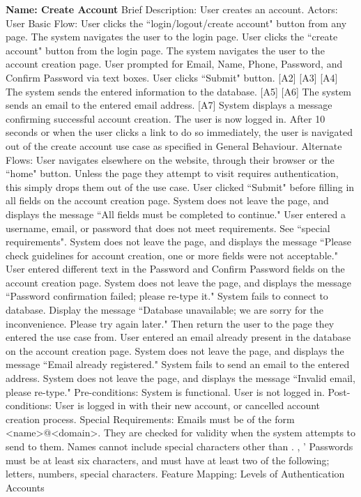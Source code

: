 \begin{outline}[enumerate]
\1 {\bf Name: Create Account}
\2 Brief Description: User creates an account.
\2 Actors: User
\2 Basic Flow:
\3 User clicks the ``login/logout/create account" button from any page.
\3 The system navigates the user to the login page.
\3 User clicks the ``create account" button from the login page.
\3 The system navigates the user to the account creation page.
\3 User prompted for Email, Name, Phone, Password, and Confirm Password via text boxes.
\3 User clicks ``Submit" button. [A2] [A3] [A4]
\3 The system sends the entered information to the database. [A5] [A6]
\3 The system sends an email to the entered email address. [A7]
\3 System displays a message confirming successful account creation.  The user is now logged in.
\3 After 10 seconds or when the user clicks a link to do so immediately, the user is navigated out of the create account use case as specified in General Behaviour.
\2 Alternate Flows:
\3 [A1] User navigates elsewhere on the website, through their browser or the ``home" button.  Unless the page they attempt to visit requires authentication, this simply drops them out of the use case.
\3 [A2] User clicked ``Submit" before filling in all fields on the account creation page.  System does not leave the page, and displays the message ``All fields must be completed to continue."
\3 [A3] User entered a username, email, or password that does not meet requirements.  See ``special requirements".  System does not leave the page, and displays the message ``Please check guidelines for account creation, one or more fields were not acceptable."
\3 [A4] User entered different text in the Password and Confirm Password fields on the account creation page.  System does not leave the page, and displays the message ``Password confirmation failed; please re-type it."
\3 [A5] System fails to connect to database.  Display the message ``Database unavailable; we are sorry for the inconvenience.  Please try again later."  Then return the user to the page they entered the use case from.
\3 [A6] User entered an email already present in the database on the account creation page.  System does not leave the page, and displays the message ``Email already registered."
\3 [A7] System fails to send an email to the entered address.  System does not leave the page, and displays the message ``Invalid email, please re-type."
\2 Pre-conditions:
\3 System is functional.
\3 User is not logged in.
\2 Post-conditions:
\3 User is logged in with their new account, or cancelled account creation process.
\2 Special Requirements:
\3 Emails must be of the form {\textless}name{\textgreater}@{\textless}domain{\textgreater}.  They are checked for validity when the system attempts to send to them.
\3 Names cannot include special characters other than . , '
\3 Passwords must be at least six characters, and must have at least two of the following; letters, numbers, special characters.
\2 Feature Mapping:
\3 Levels of Authentication
\3 Accounts

\end{outline}

